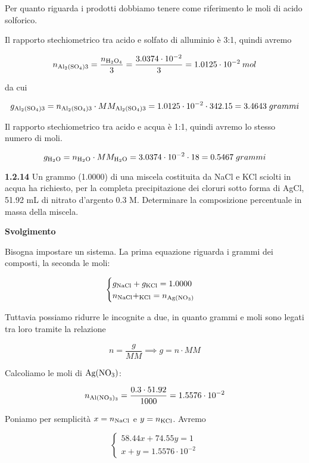Per quanto riguarda i prodotti dobbiamo tenere come riferimento le moli di acido solforico.

Il rapporto stechiometrico tra acido e solfato di alluminio è 3:1, quindi avremo

$$n_{\rm Al_2(SO_4)3}=\frac{n_{\rm H_2O_4}}{3}
=\frac{3.0374 \cdot 10^{-2}}{3}
=1.0125 \cdot 10^{-2}\:mol$$

da cui

$$g_{\rm Al_2(SO_4)3}=n_{\rm Al_2(SO_4)3} \cdot MM_{\rm Al_2(SO_4)3}
=1.0125 \cdot 10^{-2} \cdot 342.15
=3.4643\;grammi$$

Il rapporto stechiometrico tra acido e acqua è 1:1, quindi avremo lo stesso numero di moli.

$$g_{\rm H_2O}=n_{\rm H_2O} \cdot MM_{\rm H_2O}
=3.0374 \cdot 10^{-2} \cdot 18
=0.5467\;grammi$$

\vspace{0.2cm}\textbf{1.2.14} Un grammo (1.0000) di una miscela costituita da NaCl e KCl sciolti in acqua ha richiesto, per la completa precipitazione dei cloruri sotto forma di AgCl, 51.92 mL di nitrato d'argento 0.3 M. Determinare la composizione percentuale in massa della miscela.

\vspace{0.2cm}\large\textbf{Svolgimento}\normalsize

\vspace{0.2cm}Bisogna impostare un sistema. La prima equazione riguarda i grammi dei composti, la seconda le moli:

$$\begin{cases}
    g_{\rm NaCl} + g_{\rm KCl}=1.0000\\
    n_{\rm NaCl} + _{\rm KCl}=n_{\rm Ag(NO_3)}
\end{cases}$$

Tuttavia possiamo ridurre le incognite a due, in quanto grammi e moli sono legati tra loro tramite la relazione

$$n=\frac{g}{MM}
\implies
g=n \cdot MM$$

Calcoliamo le moli di $\rm Ag(NO_3)$:

$$n_{\rm Al(NO_3)_3}=\frac{0.3 \cdot 51.92}{1000}=1.5576 \cdot 10^{-2}$$

Poniamo per semplicità $x=n_{\rm NaCl}$ e $y=n_{\rm KCl}$. Avremo

$$\begin{cases}
    58.44x + 74.55y=1\\
    x+y=1.5576 \cdot 10^{-2}
\end{cases}$$

